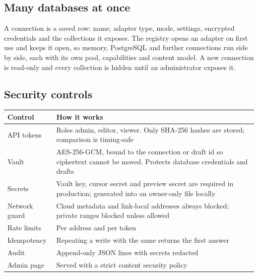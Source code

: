 \documentclass[11pt,a4paper]{article}
\newcommand{\code}[1]{\IfSubStr{\detokenize{#1}}{ }{\texttt{\detokenize{#1}}}{\texttt{\expandafter\seqsplit\expandafter{\detokenize{#1}}}}}
\begin{document}
\subsection{Many databases at once}
A connection is a saved row: name, adapter type, mode, settings, encrypted credentials and the collections it exposes. The registry opens an adapter on first use and keeps it open, so memory, PostgreSQL and further connections run side by side, each with its own pool, capabilities and content model. A new connection is read-only and every collection is hidden until an administrator exposes it.

\subsection{Security controls}
\begin{tabularx}{\linewidth}{@{}>{\raggedright\arraybackslash}p{3.6cm}X@{}}
\toprule
\textbf{Control} & \textbf{How it works}\\
\midrule
API tokens & Roles admin, editor, viewer. Only SHA-256 hashes are stored; comparison is timing-safe\\
Vault & AES-256-GCM, bound to the connection or draft id so ciphertext cannot be moved. Protects database credentials and drafts\\
Secrets & Vault key, cursor secret and preview secret are required in production; generated into an owner-only file locally\\
Network guard & Cloud metadata and link-local addresses always blocked; private ranges blocked unless allowed\\
Rate limits & Per address and per token\\
Idempotency & Repeating a write with the same \code{Idempotency-Key} returns the first answer\\
Audit & Append-only JSON lines with secrets redacted\\
Admin page & Served with a strict content security policy\\
\bottomrule
\end{tabularx}\smallskip
\end{document}
